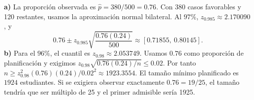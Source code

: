 \textbf{a)} La proporción observada es $\hat p=380/500=0.76$.
Con 380 casos favorables y 120 restantes, usamos la aproximación
normal bilateral. Al $97\%$, $z_{0.985}\approx2.170090$, y
\[
0.76\pm z_{0.985}\sqrt{\frac{0.76(0.24)}{500}}
\approx\boxed{[0.71855,\ 0.80145]}.
\]
\textbf{b)} Para el $96\%$, el cuantil es $z_{0.98}\approx2.053749$.
Usamos $0.76$ como proporción de planificación y exigimos
$z_{0.98}\sqrt{0.76(0.24)/n}\le0.02$. Por tanto
$n\ge z_{0.98}^2(0.76)(0.24)/0.02^2\approx1923.3554$.
El tamaño mínimo planificado es $\boxed{1924}$ estudiantes.
Si se exigiera observar exactamente $0.76=19/25$, el tamaño
tendría que ser múltiplo de 25 y el primer admisible sería 1925.
